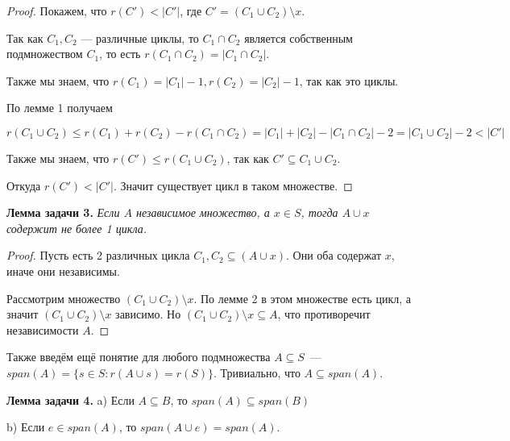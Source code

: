 \documentclass[a4paper, 12pt]{article}
\begin{document}
\begin{proof}
  Покажем, что $r(C') < |C'|$, где $C' = (C_1 \cup C_2) \setminus x$.

  Так как $C_1, C_2$ --- различные циклы, то $C_1 \cap C_2$ является собственным
  подмножеством $C_1$, то есть $r(C_1 \cap C_2) = |C_1 \cap C_2|$.

  Также мы знаем, что $r(C_1) = |C_1| - 1, r(C_2) = |C_2| - 1$, так как это циклы.

  По лемме 1 получаем

  \[
    r(C_1 \cup C_2) \leqslant r(C_1) + r(C_2) - r(C_1 \cap C_2) = |C_1| + |C_2|-
    |C_1 \cap C_2| - 2 = |C_1 \cup C_2| - 2 < |C'|
  \]

  Также мы знаем, что $r(C') \leqslant r(C_1 \cup C_2)$, так как $C' \subseteq
  C_1 \cup C_2$.

  Откуда $r(C') < |C'|$. Значит существует цикл в таком множестве.
\end{proof}

{\bf Лемма задачи 3.} {\it Если $A$ независимое множество, а $x \in S$, тогда $A \cup x$
содержит не более 1 цикла.}

\begin{proof}
  Пусть есть 2 различных цикла $C_1, C_2 \subseteq (A \cup x)$. Они оба содержат
  $x$, иначе они независимы. 

  Рассмотрим множество $(C_1 \cup C_2) \setminus x$. По лемме 2 в этом множестве
  есть цикл, а значит $(C_1 \cup C_2) \setminus x$ зависимо. Но $(C_1 \cup C_2)
  \setminus x \subseteq A$, что противоречит независимости $A$.
\end{proof}

Также введём ещё понятие для любого подмножества $A \subseteq S$~---
$span(A) = \{s \in S : r(A \cup s) = r(S)\}$. Тривиально, что $A \subseteq span(A)$.

{\bf Лемма задачи 4.} a) Если $A \subseteq B$, то $span(A) \subseteq span(B)$

b) Если $e \in span(A)$, то $span(A \cup e) = span(A)$.
\end{document}
